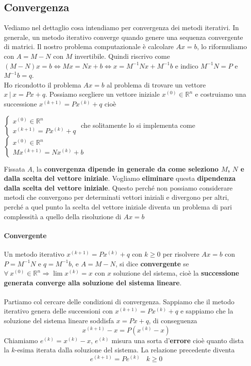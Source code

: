 \documentclass[10pt]{book}
\begin{document}
\subsection{Convergenza}
Vediamo nel dettaglio cosa intendiamo per convergenza dei metodi iterativi. In generale, un metodo iterativo converge quando genere una sequenza convergente di matrici. Il nostro problema computazionale è calcolare $Ax = b$, lo riformuliamo con $A = M - N$ con $M$ invertibile. Quindi riscrivo come $(M - N)x = b \Leftrightarrow Mx = Nx + b \Leftrightarrow x = M^{-1}N x + M^{-1}b$ e indico $M^{-1}N = P$ e $M^{-1}b = q$.\\
Ho ricondotto il problema $Ax = b$ al problema di trovare un vettore $x\:|\: x = Px + q$. Possiamo scegliere un vettore iniziale $x^{(0)} \in \mathbb{R}^n$ e costruiamo una successione $x^{(k+1)} = Px^{(k)} + q$ cioè
\begin{list}{}{}
	\item $\left\{\begin{array}{l} x^{(0)} \in \mathbb{R}^n\\x^{(k+1)} = Px^{(k)} + q \end{array}\right. $ che solitamente lo si implementa come $\left\{\begin{array}{l} x^{(0)} \in \mathbb{R}^n\\Mx^{(k+1)} = Nx^{(k)} + b \end{array}\right. $ 
\end{list}
Fissata $A$, la \textbf{convergenza dipende in generale da come seleziono $M$, $N$ e dalla scelta del vettore iniziale}. Vogliamo \textbf{eliminare} questa \textbf{dipendenza dalla scelta del vettore iniziale}. Questo perché non possiamo considerare metodi che convergono per determinati vettori iniziali e divergono per altri, perché a quel punto la scelta del vettore iniziale diventa un problema di pari complessità a quello della risoluzione di $Ax = b$
\paragraph{Convergente} Un metodo iterativo $x^{(k+1)} = Px^{(k)} + q$ con $k \geq 0$ per risolvere $Ax = b$ con $P = M^{-1}N$ e $q = M^{-1}b$, e $A = M - N$, si dice \textbf{convergente} se $\forall\:x^{(0)}\in \mathbb{R}^n \Rightarrow \lim x^{(k)} = x$ con $x$ soluzione del sistema, cioè la \textbf{successione generata converge alla soluzione del sistema lineare}.\\\\
Partiamo col cercare delle condizioni di convergenza. Sappiamo che il metodo iterativo genera delle successioni con $x^{(k+1)} = Px^{(k)} + q$ e sappiamo che la soluzione del sistema lineare soddisfa $x = Px + q$, di conseguenza
$$x^{(k+1)} - x = P(x^{(k)} - x)$$
Chiamiamo $e^{(k)} = x^{(k)} - x$, $e^{(k)}$ misura una sorta d'\textbf{errore} cioè quanto dista la $k$-esima iterata dalla soluzione del sistema. La relazione precedente diventa $$e^{(k + 1)} = Pe^{(k)}\:\:\:\: k\geq 0$$
\end{document}
